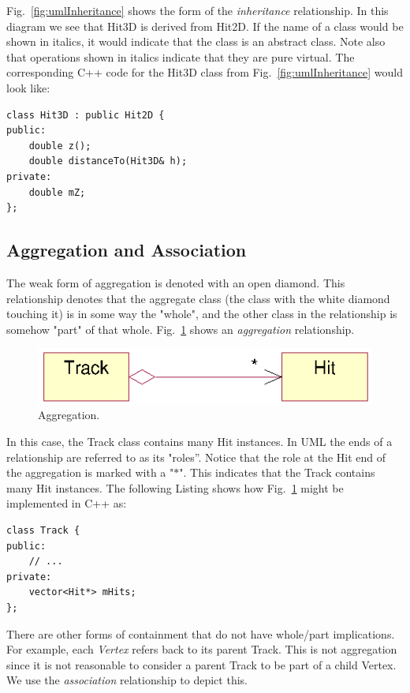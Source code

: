 \documentclass[twoside]{article}
\newcommand{\name}[1]{\textsl{#1}}%
\begin{document}
Fig.~\ref{fig:umlInheritance} shows the form of the \emph{inheritance}
relationship.  In this diagram we see that Hit3D is derived from
Hit2D.  If the name of a class would be shown in italics, it would
indicate that the class is an abstract class.  Note also that
operations shown in italics indicate that they are pure virtual.  The
corresponding C++ code for the Hit3D class from
Fig.~\ref{fig:umlInheritance} would look like:

{\footnotesize
\begin{verbatim}
class Hit3D : public Hit2D {
public:
    double z();
    double distanceTo(Hit3D& h);
private:
    double mZ;
};
\end{verbatim}
}%

\subsection{Aggregation and Association}

The weak form of aggregation is denoted with an open diamond. This
relationship denotes that the aggregate class (the class with the
white diamond touching it) is in some way the "whole", and the other
class in the relationship is somehow "part" of that whole.
Fig.~\ref{fig:umlAggregation} shows an \emph{aggregation}
relationship.
\begin{figure}[htb]
    \begin{center}
        \includegraphics{umlAggregation.eps}
        \caption{Aggregation.}
        \label{fig:umlAggregation}
    \end{center}
\end{figure}
In this case, the Track class contains many Hit instances. In UML the
ends of a relationship are referred to as its "roles''. Notice that
the role at the Hit end of the aggregation is marked with a "$*$".
This indicates that the Track contains many Hit instances.  The
following Listing shows how Fig.~\ref{fig:umlAggregation} might be
implemented in C++ as:

{\footnotesize
\begin{verbatim}
class Track {
public:
    // ...
private:
    vector<Hit*> mHits;
};
\end{verbatim}
}%

There are other forms of containment that do not have whole/part
implications. For example, each \name{Vertex} refers back to its
parent Track. This is not aggregation since it is not reasonable to
consider a parent Track to be part of a child Vertex. We use the
\emph{association} relationship to depict this.
\end{document}
